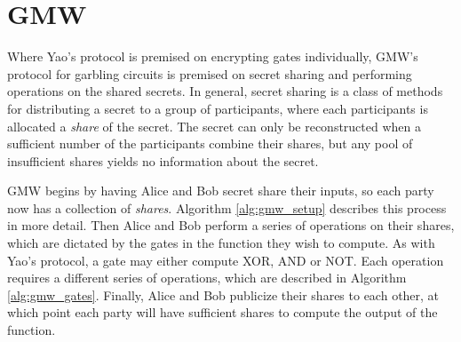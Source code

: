\section{GMW}
Where Yao's protocol is premised on encrypting gates individually, GMW's protocol for garbling circuits is premised on secret sharing and performing operations on the shared secrets. 
In general, secret sharing is a class of methods for distributing a secret to a group of participants, where each participants is allocated a \textit{share} of the secret. 
The secret can only be reconstructed when a sufficient number of the participants combine their shares, but any pool of insufficient shares yields no information about the secret.

GMW begins by having Alice and Bob secret share their inputs, so each party now has a collection of \textit{shares}. 
Algorithm \ref{alg:gmw_setup} describes this process in more detail.
Then Alice and Bob perform a series of operations on their shares, which are dictated by the gates in the function they wish to compute.
As with Yao's protocol, a gate may either compute XOR, AND or NOT.
Each operation requires a different series of operations, which are described in Algorithm \ref{alg:gmw_gates}.
Finally, Alice and Bob publicize their shares to each other, at which point each party will have sufficient shares to compute the output of the function.

